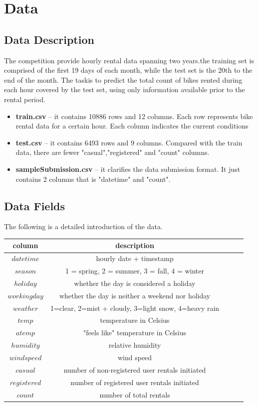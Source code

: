 \documentclass{amsart}
\begin{document}
\section{Data} \label{sec-preliminaries}
\subsection{Data Description}
The competition provide hourly rental data spanning two years.the training set is comprised of the first 19 days of each month, while the test set is the 20th to the end of the month. The taskis to predict the total count of bikes rented during each hour covered by the test set, using only information available prior to the rental period.\\

\begin{itemize}
	\smallskip
	\item \textbf{train.csv} -- it contains 10886 rows and 12 columns. Each row represents bike rental data for a certain hour. Each column indicates the current conditions
	\smallskip
	\item \textbf{test.csv} -- it contains 6493 rows and 9 columns. Compared with the train data, there are fewer "casual","registered" and "count" columns.
	\smallskip
	\item \textbf{sampleSubmission.csv} -- it clarifies the data submission format. It just contains 2 columns that is "datetime" and "count".
\end{itemize}

\subsection{Data Fields}
The following is a detailed introduction of the data.\\
\begin{tabular}{c| c c c c }
	\toprule
	\textbf{column} & \textbf{description}  \\
	\midrule
	$datetime$ &  {hourly date + timestamp }\\
	$season$ &  {1 = spring, 2 = summer, 3 = fall, 4 = winter} \\
	$holiday$ &  {whether the day is considered a holiday} \\
	$workingday$ &  {whether the day is neither a weekend nor holiday} \\
	$weather$ &  {1=clear, 2=mist + cloudy, 3=light snow, 4=heavy rain} \\
	$temp$ & {temperature in Celsius} \\
	$atemp$ & {"feels like" temperature in Celsius} \\
	$humidity$ & {relative humidity} \\
	$windspeed$ & {wind speed} \\
	$casual$ & {number of non-registered user rentals initiated} \\
	$registered$ & {number of registered user rentals initiated} \\
	$count$ & {number of total rentals} \\
	\bottomrule
\end{tabular}
\end{document}
